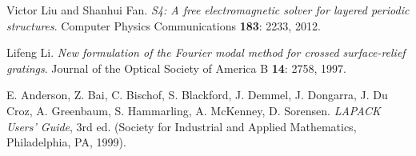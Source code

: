 \documentclass[a4paper,10pt]{article}
\begin{document}
\newpage
{}
{}
\begin{thebibliography}{99}

Victor Liu and Shanhui Fan.
\textit{S4: A free electromagnetic solver for layered periodic structures}.
Computer Physics Communications \textbf{183}: 2233, 2012.

Lifeng Li.
\textit{New formulation of the Fourier modal method for crossed surface-relief gratings}.
Journal of the Optical Society of America B \textbf{14}: 2758, 1997.

E. Anderson, Z. Bai, C. Bischof, S. Blackford, J. Demmel, J. Dongarra, J. Du Croz, A. Greenbaum, S. Hammarling, A. McKenney, D. Sorensen.
\textit{LAPACK Users' Guide}, 3rd ed.
(Society for Industrial and Applied Mathematics, Philadelphia, PA, 1999).

\end{thebibliography}
\end{document}
